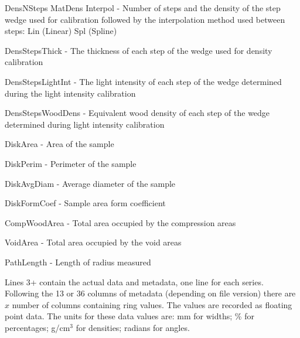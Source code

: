 \begin{itemize*}
DensNSteps MatDens Interpol - Number of steps and the density of the step wedge used for calibration followed by the interpolation method used between steps: Lin (Linear) Spl (Spline)
\item 

DensStepsThick - The thickness of each step of the wedge used for density calibration
\item 

DensStepsLightInt - The light intensity of each step of the wedge determined during the light intensity calibration
\item 

DensStepsWoodDens - Equivalent wood density of each step of the wedge determined during light intensity calibration
\item 

DiskArea - Area of the sample
\item 

DiskPerim - Perimeter of the sample
\item 

DiskAvgDiam - Average diameter of the sample
\item 

DiskFormCoef - Sample area form coefficient
\item 

CompWoodArea - Total area occupied by the compression areas
\item 

VoidArea - Total area occupied by the void areas
\item 

PathLength - Length of radius measured 
\end{itemize*}

Lines 3+ contain the actual data and metadata, one line for each series. Following the 13 or 36 columns of metadata (depending on file version) there are $x$ number of columns containing ring values. The values are recorded as floating point data. The units for these data values are: mm for widths; \% for percentages; g/cm$^3$ for densities; radians for angles. 

\label{txt:fileFormatsEnd}
